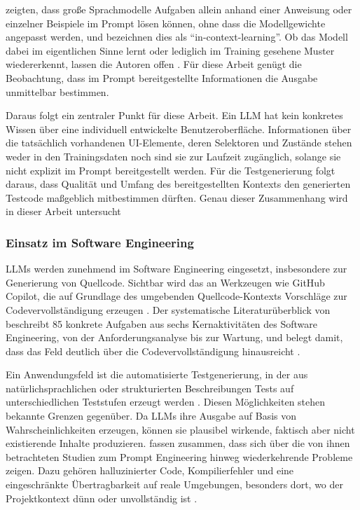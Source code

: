 \textcite[S.~1,~4]{brown_language_2020} zeigten, dass große Sprachmodelle Aufgaben allein anhand einer Anweisung oder einzelner Beispiele im Prompt lösen können, ohne dass die Modellgewichte angepasst werden, und bezeichnen dies als \enquote{in-context-learning}. Ob das Modell dabei im eigentlichen Sinne lernt oder lediglich im Training gesehene Muster wiedererkennt, lassen die Autoren offen \parencite[S.~34]{brown_language_2020}. Für diese Arbeit genügt die Beobachtung, dass im Prompt bereitgestellte Informationen die Ausgabe unmittelbar bestimmen.

Daraus folgt ein zentraler Punkt für diese Arbeit. Ein LLM hat kein konkretes Wissen über eine individuell entwickelte Benutzeroberfläche. Informationen über die tatsächlich vorhandenen \ac{UI}-Elemente, deren Selektoren und Zustände stehen weder in den Trainingsdaten noch sind sie zur Laufzeit zugänglich, solange sie nicht explizit im Prompt bereitgestellt werden. Für die Testgenerierung folgt daraus, dass Qualität und Umfang des bereitgestellten Kontexts den generierten Testcode maßgeblich mitbestimmen dürften. Genau dieser Zusammenhang wird in dieser Arbeit untersucht

\subsubsection{Einsatz im Software Engineering}

\acp{LLM} werden zunehmend im Software Engineering eingesetzt, insbesondere zur Generierung von Quellcode. Sichtbar wird das an Werkzeugen wie GitHub Copilot, die auf Grundlage des umgebenden Quellcode-Kontexts Vorschläge zur Codevervollständigung erzeugen \parencite[S.~30]{hou_large_2024}. Der systematische Literaturüberblick von \textcite{hou_large_2024} beschreibt 85 konkrete Aufgaben aus sechs Kernaktivitäten des Software Engineering, von der Anforderungsanalyse bis zur Wartung, und belegt damit, dass das Feld deutlich über die Codevervollständigung hinausreicht \parencite[S.~4]{hou_large_2024}.

Ein Anwendungsfeld ist die automatisierte Testgenerierung, in der aus natürlichsprachlichen oder strukturierten Beschreibungen Tests auf unterschiedlichen Teststufen erzeugt werden \parencite{celik_review_2025,ferreira_acceptance_2025,alian_feature-driven_2024}. Diesen Möglichkeiten stehen bekannte Grenzen gegenüber. Da \acp{LLM} ihre Ausgabe auf Basis von Wahrscheinlichkeiten erzeugen, können sie plausibel wirkende, faktisch aber nicht existierende Inhalte produzieren. \textcite{celik_review_2025} fassen zusammen, dass sich über die von ihnen betrachteten Studien zum Prompt Engineering hinweg wiederkehrende Probleme zeigen. Dazu gehören halluzinierter Code, Kompilierfehler und eine eingeschränkte Übertragbarkeit auf reale Umgebungen, besonders dort, wo der Projektkontext dünn oder unvollständig ist \parencite[S.~10]{celik_review_2025}.

